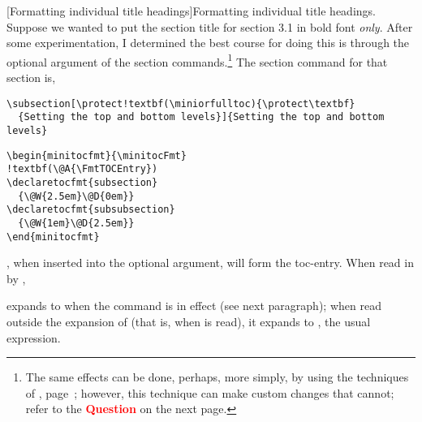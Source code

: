 \documentclass[10pt]{article}
\makeatletter
\renewcommand*{\thesubparagraph}{\texorpdfstring{\protect\P\protect\P}{\textparagraph\textparagraph}}
\renewcommand{\subparagraph}
    {\renewcommand{\@seccntformat}[1]{\thesubparagraph\space}%
    \@startsection{subparagraph}{5}{\parindent}{6pt}{-3pt}{\bfseries}}
\edef\amtIndent{\the\parindent}
\makeatother
\begin{document}
\subparagraph[Formatting individual title headings]{Formatting individual
title headings.} Suppose we wanted to put the section title for section 3.1
in bold font \emph{only}. After some experimentation, I determined the best
course for doing this is through the optional argument of the section
commands.\footnote{The same effects can be done, perhaps, more simply, by
using the techniques of \textbf{},
page~\pageref*{subpara:@E};  however, this technique can make custom changes
that  cannot; refer to the \textbf{\textcolor{red}{Question}} on the
next page.} \medbreak \bVerb The section command for that section is,
\begin{Verbatim}[xleftmargin=\amtIndent,fontsize=\small,commandchars=!()]
\subsection[\protect!textbf(\miniorfulltoc){\protect\textbf}
  {Setting the top and bottom levels}]{Setting the top and bottom levels}
\end{Verbatim}
\par\medskip
{}
\noindent\hskip-62.5pt\begin{minipage}{\linewidth+62.5pt}
\begin{minipage}[c]{.5\linewidth-5pt}\small\kern0pt
\minitocFmtiv\insertminitoc[CandM]
\end{minipage}\hfill
\begin{minipage}[c]{.5\linewidth-5pt}\kern0pt
\begin{Verbatim}[fontsize=\small,commandchars=!()]
\begin{minitocfmt}{\minitocFmt}
!textbf(\@A{\FmtTOCEntry})
\declaretocfmt{subsection}
  {\@W{2.5em}\@D{0em}}
\declaretocfmt{subsubsection}
  {\@W{1em}\@D{2.5em}}
\end{minitocfmt}
\end{Verbatim}
\end{minipage}
\end{minipage}
\medskip\eVerb {}, when inserted into
the optional argument, will form the toc-entry. When read in by ,
\begin{quote}\end{quote} expands to
\texttt{} when the command
 is in effect (see next paragraph); when read outside the
expansion of  (that is, when  is
read), it expands to \texttt{}, the usual expression.
\end{document}
